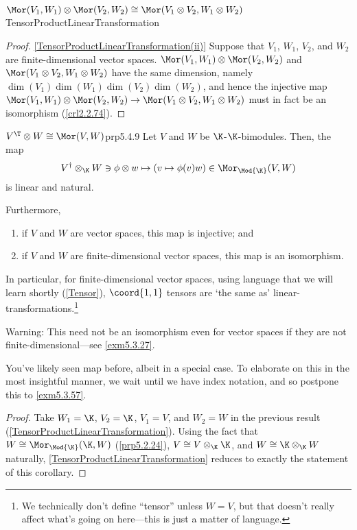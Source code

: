 \begin{thm}{$\Mor (V_1,W_1)\otimes \Mor (V_2,W_2)\cong \Mor (V_1\otimes V_2,W_1\otimes W_2)$}{TensorProductLinearTransformation}
\begin{proof}
		\blni
		\cref{TensorProductLinearTransformation(ii)} Suppose that $V_1$, $W_1$, $V_2$, and $W_2$ are finite-dimensional vector spaces.  $\Mor (V_1,W_1)\otimes \Mor (V_2,W_2)$ and $\Mor (V_1\otimes V_2,W_1\otimes W_2)$ have the same dimension, namely $\dim (V_1)\dim (W_1)\dim (V_2)\dim (W_2)$, and hence the injective map $\Mor (V_1,W_1)\otimes \Mor (V_2,W_2)\rightarrow \Mor (V_1\otimes V_2,W_1\otimes W_2)$ must in fact be an isomorphism (\cref{crl2.2.74}).
	\end{proof}
\end{thm}
\begin{crl}{$V^{\T}\otimes W\cong \Mor (V,W)$}{prp5.4.9}
	Let $V$ and $W$ be $\K$-$\K$-bimodules.  Then, the map
	\begin{equation*}
		V^{\dagger}\otimes _{\K}W\ni \phi \otimes w\mapsto (v\mapsto \phi (v)w)\in \Mor _{\Mod{\K}}(V,W)
	\end{equation*}
	is linear and natural.
	
	Furthermore,
	\begin{enumerate}
		\item if $V$ and $W$ are vector spaces, this map is injective; and
		\item if $V$ and $W$ are finite-dimensional vector spaces, this map is an isomorphism.
	\end{enumerate}
	\begin{rmk}
		In particular, for finite-dimensional vector spaces, using language that we will learn shortly (\cref{Tensor}), $\coord{1,1}$ tensors are `the same as' linear-transformations.\footnote{We technically don't define ``tensor'' unless $W=V$, but that doesn't really affect what's going on here---this is just a matter of language.}
	\end{rmk}
	\begin{rmk}
		Warning:  This need not be an isomorphism even for vector spaces if they are not finite-dimensional---see \cref{exm5.3.27}.
	\end{rmk}
	\begin{rmk}
		You've likely seen map before, albeit in a special case.  To elaborate on this in the most insightful manner, we wait until we have index notation, and so postpone this to \cref{exm5.3.57}.
	\end{rmk}
	\begin{proof}
		Take $W_1=\K$, $V_2=\K$, $V_1=V$, and $W_2=W$ in the previous result (\cref{TensorProductLinearTransformation}).  Using the fact that $W\cong \Mor _{\Mod{\K}}(\K ,W)$ (\cref{prp5.2.24}), $V\cong V\otimes _{\K}\K$, and $W\cong \K \otimes _{\K}W$ naturally, \cref{TensorProductLinearTransformation} reduces to exactly the statement of this corollary.
	\end{proof}
\end{crl}

